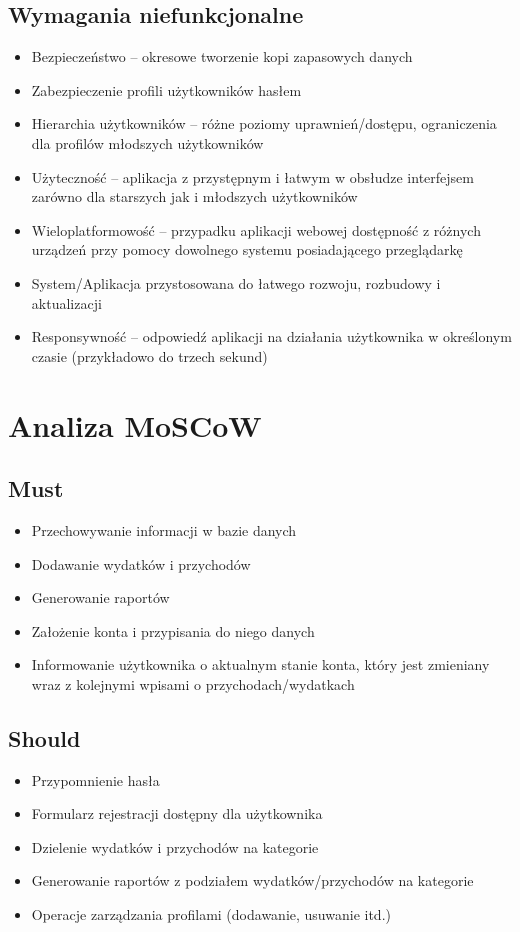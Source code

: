 \documentclass[12pt,a4paper,oneside]{article}
\begin{document}
\subsection{Wymagania niefunkcjonalne}
\begin{itemize}
    \item Bezpieczeństwo – okresowe tworzenie kopi zapasowych danych
    \item Zabezpieczenie profili użytkowników hasłem
    \item Hierarchia użytkowników – różne poziomy uprawnień/dostępu,
          ograniczenia dla profilów młodszych użytkowników
    \item Użyteczność – aplikacja z przystępnym i łatwym w obsłudze interfejsem
          zarówno dla starszych jak i młodszych użytkowników
    \item Wieloplatformowość – przypadku aplikacji webowej dostępność z różnych
          urządzeń przy pomocy dowolnego systemu posiadającego przeglądarkę
    \item System/Aplikacja przystosowana do łatwego rozwoju, rozbudowy i
          aktualizacji
    \item Responsywność – odpowiedź aplikacji na działania użytkownika w
          określonym czasie (przykładowo do trzech sekund)
\end{itemize}

\section{Analiza MoSCoW}
\subsection{Must}
\begin{itemize}
    \item Przechowywanie informacji w bazie danych
    \item Dodawanie wydatków i przychodów
    \item Generowanie raportów
    \item Założenie konta i przypisania do niego danych
    \item Informowanie użytkownika o aktualnym stanie konta, który jest
          zmieniany wraz z kolejnymi wpisami o przychodach/wydatkach
\end{itemize}

\subsection{Should}
\begin{itemize}
    \item Przypomnienie hasła
    \item Formularz rejestracji dostępny dla użytkownika
    \item Dzielenie wydatków i przychodów na kategorie
    \item Generowanie raportów z podziałem wydatków/przychodów na kategorie
    \item Operacje zarządzania profilami (dodawanie, usuwanie itd.)
\end{itemize}
\end{document}
